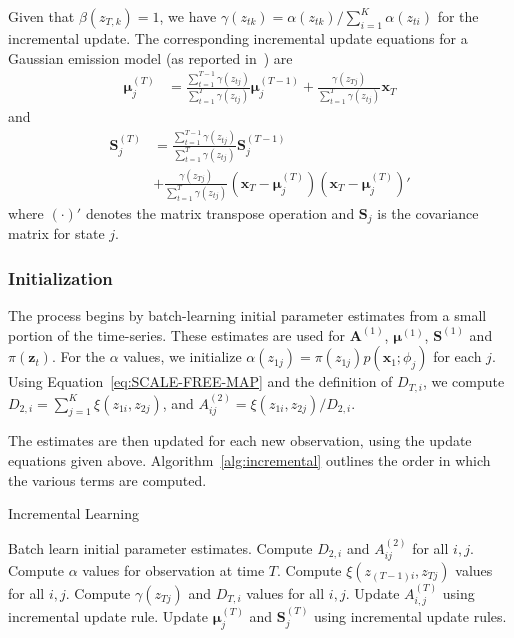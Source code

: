 \documentclass[letterpaper]{article}
\begin{document}
Given that $\beta(z_{T,k}) = 1$, we have $\gamma(z_{tk}) = \alpha(z_{tk}) / \sum_{i=1}^{K}\alpha(z_{ti})$ for the incremental update. The corresponding incremental update equations for a Gaussian emission model (as reported in~\cite{stenger2001}) are 
\begin{align*}
    \mathbf{\mu}_{j}^{(T)} &= \frac{\sum_{t=1}^{T-1}\gamma(z_{tj})}{\sum_{t=1}^{T}\gamma(z_{tj})}\mathbf{\mu}_{j}^{(T-1)} + \frac{\gamma(z_{Tj})}{\sum_{t=1}^{T}\gamma(z_{tj})}\mathbf{x}_T
\end{align*}
and
\begin{align*}
    \mathbf{S}_j^{(T)} &= \frac{\sum_{t=1}^{T-1}\gamma(z_{tj})}{\sum_{t=1}^{T}\gamma(z_{tj})}\mathbf{S}_j^{(T-1)} \\
                       &+ \frac{\gamma(z_{Tj})}{\sum_{t=1}^{T}\gamma(z_{tj})}\left(\mathbf{x}_T - \mathbf{\mu}_j^{(T)}\right)\left(\mathbf{x}_T - \mathbf{\mu}_j^{(T)}\right)'
\end{align*}
where $(\cdot)'$ denotes the matrix transpose operation and $\mathbf{S}_j$ is the covariance matrix for state $j$.

\subsubsection{Initialization}

The process begins by batch-learning initial parameter estimates from a small
portion of the time-series. These estimates are used for $\mathbf{A}^{(1)}$,
$\mathbf{\mu}^{(1)}$, $\mathbf{S}^{(1)}$ and $\pi(\mathbf{z}_t)$. For the
$\alpha$ values, we initialize $\alpha(z_{1j}) = \pi(z_{1j})p(\mathbf{x}_1;
\phi_j)$ for each $j$. Using Equation~\ref{eq:SCALE-FREE-MAP} and the definition
of $D_{T,i}$, we compute $D_{2,i} = \sum_{j=1}^{K} \xi(z_{1i}, z_{2j})$, and 
$A_{ij}^{(2)} = \xi(z_{1i}, z_{2j})/D_{2,i}$.

The estimates are then updated for each new observation, using the update equations given above. Algorithm~\ref{alg:incremental} outlines the order in which the various terms are computed.

\begin{algorithm}
\caption{Incremental Learning}
\small
\begin{algorithmic}[1]
\State Batch learn initial parameter estimates.
\State Compute $D_{2,i}$ and $A_{ij}^{(2)}$ for all $i,j$.
\State Compute $\alpha$ values for observation at time $T$.
\State Compute $\xi(z_{(T-1)i},z_{Tj})$ values for all $i,j$.
\State Compute $\gamma(z_{Tj})$ and $D_{T,i}$ values for all $i,j$.
\State Update $A_{i,j}^{(T)}$ using incremental update rule.
\State Update $\mathbf{\mu}_{j}^{(T)}$ and $\mathbf{S}_{j}^{(T)}$ using incremental update rules.
\EndFor
\end{algorithmic}
\label{alg:incremental}
\end{algorithm}
\end{document}

